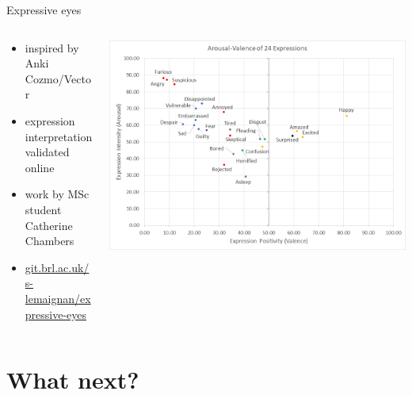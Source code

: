 \documentclass[xcolor=table]{beamer}
\begin{document}
\begin{frame}{Expressive eyes}
    \begin{columns}
        \begin{column}{0.5\linewidth}
            {
                \scriptsize
            \begin{itemize}
                \item inspired by Anki Cozmo/Vector
                \item expression interpretation validated online
                \item work by MSc student Catherine Chambers
                \item
                    \href{https://git.brl.ac.uk/s-lemaignan/expressive-eyes}{git.brl.ac.uk/s-lemaignan/expressive-eyes}
            \end{itemize}
        }
        \end{column}
        \begin{column}{0.5\linewidth}
        \begin{center}
            \includegraphics[width=\linewidth]{figs/expressive-eyes/online-study.png}
        \end{center}
        \end{column}
    \end{columns}
\end{frame}




\section{What next?}
\end{document}
